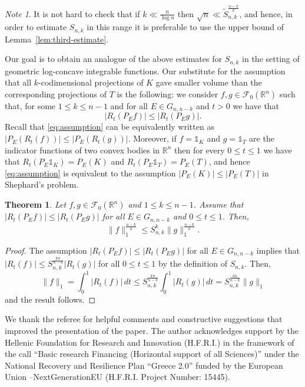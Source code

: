 \documentclass[11pt,leqno]{article}
\newtheorem{theorem}{Theorem}[section]
\theoremstyle{definition}
\theoremstyle{remark}
\newtheorem*{note*}{Note}
\numberwithin{equation}{section}
\newcommand{\ls}{\leqslant}
\newcommand{\1}{\textbf{1}}
\begin{document}
\begin{note*}It is not hard to check that if $k\ll\frac{n}{\log n}$ then $\sqrt{n}\ll \tilde{S}_{n,k}^{\frac{n-k}{k}}$,
and hence, in order to estimate $S_{n,k}$ in this range it is preferable to use the upper bound of Lemma~\ref{lem:third-estimate}.
\end{note*}

Our goal is to obtain an analogue of the above estimates for $S_{n,k}$ in the setting of geometric log-concave
integrable functions. Our substitute for the assumption that all $k$-codimensional projections of $K$ gave
smaller volume than the corresponding projections of $T$ is the following: we consider $f,g\in {\mathcal F}_0({\mathbb R}^n)$
such that, for some $1\ls k\ls n-1$ and for all $E\in G_{n,n-k}$ and $t>0$ we have that
\begin{equation}\label{eq:assumption}|R_t(P_Ef)|\ls |R_t(P_Eg)|.\end{equation}
Recall that \eqref{eq:assumption} can be equivalently written as $|P_E(R_t(f))|\ls |P_E(R_t(g))|$. Moreover,
if $f=\mathds{1}_K$ and $g=\mathds{1}_T$ are the indicator functions of two convex bodies in ${\mathbb R}^n$ then
for every $0\ls t\ls 1$ we have that $R_t(P_E\mathds{1}_K)=P_E(K)$ and $R_t(P_E\mathds{1}_T)=P_E(T)$,
and hence \eqref{eq:assumption} is equivalent to the assumption $|P_E(K)|\ls |P_E(T)|$
in Shephard's problem.

\begin{theorem}\label{th:shephard}Let $f,g\in {\mathcal F}_0({\mathbb R}^n)$ and $1\ls k\ls n-1$. Assume that $|R_t(P_Ef)|\ls |R_t(P_Eg)|$ for all $E\in G_{n,n-k}$ and $0\ls t\ls 1$. Then,
$$\|f\|_1^{\frac{n-k}{n}}\ls S_{n,k}^k\|g\|_1^{\frac{n-k}{n}}.$$
\end{theorem}

\begin{proof}The assumption $|R_t(P_Ef)|\ls |R_t(P_Eg)|$ for all $E\in G_{n,n-k}$ implies that $|R_t(f)|\ls S_{n,k}^{\frac{kn}{n-k}}|R_t(g)|$ for all $0\ls t\ls 1$ by the definition of $S_{n,k}$. Then,
$$\|f\|_1=\int_0^1|R_t(f)|\,dt\ls S_{n,k}^{\frac{kn}{n-k}}\int_0^1|R_t(g)|\,dt=S_{n,k}^{\frac{kn}{n-k}}\|g\|_1$$
and the result follows.\end{proof}





\bigskip

 We thank the referee for helpful comments and constructive suggestions that improved the presentation of the paper. 
The author acknowledges support by the Hellenic Foundation for Research and Innovation (H.F.R.I.) in the framework of the 
call ``Basic research Financing (Horizontal support of all Sciences)” under the National Recovery and Resilience Plan ``Greece 2.0” funded by
the European Union –NextGenerationEU (H.F.R.I. Project Number: 15445).
\end{document}
